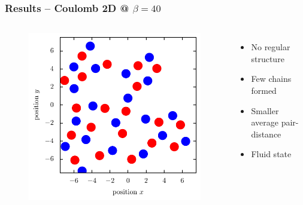 \documentclass[mathserif,serif]{beamer}
\begin{document}
\begin{frame}
	\frametitle{Results -- Coulomb 2D @ $\beta=40$}
	\centering
	\begin{columns}	
	\begin{figure}
	\includegraphics[width=\textwidth]{../report/figures/Fluid_1_beta_40.pdf}
	\end{figure}
	\begin{itemize}
	\item No regular structure
	\item Few chains formed
	\item Smaller average pair-distance
	\item Fluid state
	\end{itemize}
\end{columns}
\end{frame}
\end{document}
